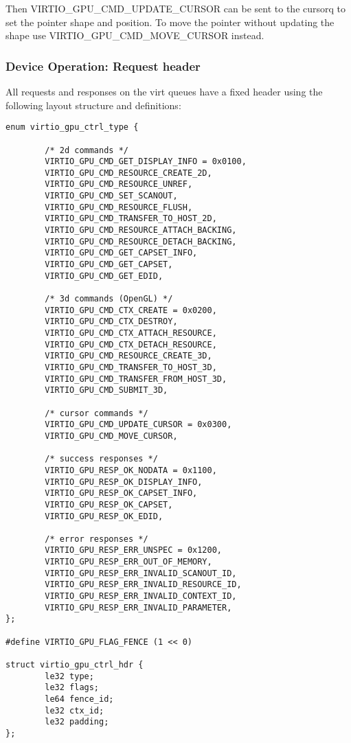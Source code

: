 Then VIRTIO_GPU_CMD_UPDATE_CURSOR can be sent to the cursorq to set
the pointer shape and position.  To move the pointer without updating
the shape use VIRTIO_GPU_CMD_MOVE_CURSOR instead.

\subsubsection{Device Operation: Request header}\label{sec:Device Types / GPU Device / Device Operation / Device Operation: Request header}

All requests and responses on the virt queues have a fixed header
using the following layout structure and definitions:

\begin{lstlisting}
enum virtio_gpu_ctrl_type {

        /* 2d commands */
        VIRTIO_GPU_CMD_GET_DISPLAY_INFO = 0x0100,
        VIRTIO_GPU_CMD_RESOURCE_CREATE_2D,
        VIRTIO_GPU_CMD_RESOURCE_UNREF,
        VIRTIO_GPU_CMD_SET_SCANOUT,
        VIRTIO_GPU_CMD_RESOURCE_FLUSH,
        VIRTIO_GPU_CMD_TRANSFER_TO_HOST_2D,
        VIRTIO_GPU_CMD_RESOURCE_ATTACH_BACKING,
        VIRTIO_GPU_CMD_RESOURCE_DETACH_BACKING,
        VIRTIO_GPU_CMD_GET_CAPSET_INFO,
        VIRTIO_GPU_CMD_GET_CAPSET,
        VIRTIO_GPU_CMD_GET_EDID,

        /* 3d commands (OpenGL) */
        VIRTIO_GPU_CMD_CTX_CREATE = 0x0200,
        VIRTIO_GPU_CMD_CTX_DESTROY,
        VIRTIO_GPU_CMD_CTX_ATTACH_RESOURCE,
        VIRTIO_GPU_CMD_CTX_DETACH_RESOURCE,
        VIRTIO_GPU_CMD_RESOURCE_CREATE_3D,
        VIRTIO_GPU_CMD_TRANSFER_TO_HOST_3D,
        VIRTIO_GPU_CMD_TRANSFER_FROM_HOST_3D,
        VIRTIO_GPU_CMD_SUBMIT_3D,

        /* cursor commands */
        VIRTIO_GPU_CMD_UPDATE_CURSOR = 0x0300,
        VIRTIO_GPU_CMD_MOVE_CURSOR,

        /* success responses */
        VIRTIO_GPU_RESP_OK_NODATA = 0x1100,
        VIRTIO_GPU_RESP_OK_DISPLAY_INFO,
        VIRTIO_GPU_RESP_OK_CAPSET_INFO,
        VIRTIO_GPU_RESP_OK_CAPSET,
        VIRTIO_GPU_RESP_OK_EDID,

        /* error responses */
        VIRTIO_GPU_RESP_ERR_UNSPEC = 0x1200,
        VIRTIO_GPU_RESP_ERR_OUT_OF_MEMORY,
        VIRTIO_GPU_RESP_ERR_INVALID_SCANOUT_ID,
        VIRTIO_GPU_RESP_ERR_INVALID_RESOURCE_ID,
        VIRTIO_GPU_RESP_ERR_INVALID_CONTEXT_ID,
        VIRTIO_GPU_RESP_ERR_INVALID_PARAMETER,
};

#define VIRTIO_GPU_FLAG_FENCE (1 << 0)

struct virtio_gpu_ctrl_hdr {
        le32 type;
        le32 flags;
        le64 fence_id;
        le32 ctx_id;
        le32 padding;
};
\end{lstlisting}

